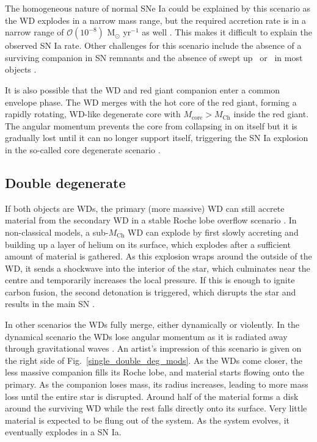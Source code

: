 \documentclass[a4paper,oneside,12pt, class=Latex/Classes/PhDthesisPSnPDF, crop=false]{standalone}
\begin{document}
The homogeneous nature of normal SNe Ia could be explained by this scenario as the WD explodes in a narrow mass range, but the required accretion rate is in a narrow range of $\mathcal{O}(10^{-8})$ M$_\odot$ yr$^{-1}$ as well \citep[e.g.][]{He-accreting_WDs, accreting_WDs}. This makes it difficult to explain the observed SN Ia rate. Other challenges for this scenario include the absence of a surviving companion in SN remnants \citep[e.g][]{SNR0509_no_survivor, Kepler_no_survivor} and the absence of swept up \ or \ in most objects \citep{companion_H_in_Ia_search, Ia_nebular_specs}.

It is also possible that the WD and red giant companion enter a common envelope phase. The WD merges with the hot core of the red giant, forming a rapidly rotating, WD-like degenerate core with $M_\text{core}>M_\text{Ch}$ inside the red giant. The angular momentum prevents the core from collapsing in on itself but it is gradually lost until it can no longer support itself, triggering the SN Ia explosion in the so-called core degenerate scenario \citep{Kashi_core_deg}.


\subsection{Double degenerate}
If both objects are WDs, the primary (more massive) WD can still accrete material from the secondary WD in a stable Roche lobe overflow scenario \citep{CO_accretion_II, CO_accretion_I}. In non-classical models, a sub-$M_\text{Ch}$ WD can explode by first slowly accreting and building up a layer of helium on its surface, which explodes after a sufficient amount of material is gathered. As this explosion wraps around the outside of the WD, it sends a shockwave into the interior of the star, which culminates near the centre and temporarily increases the local pressure. If this is enough to ignite carbon fusion, the second detonation is triggered, which disrupts the star and results in the main SN \citep{Taam_ddet, Livne_ddet, Shen_ddet, Fink_ddet}.

In other scenarios the WDs fully merge, either dynamically or violently. In the dynamical scenario the WDs lose angular momentum as it is radiated away through gravitational waves \citep{Iben_Double_degenerate, Webbink_Double_degenerate}. An artist's impression of this scenario is given on the right side of Fig.~\ref{single_double_deg_mods}. As the WDs come closer, the less massive companion fills its Roche lobe, and material starts flowing onto the primary. As the companion loses mass, its radius increases, leading to more mass loss until the entire star is disrupted. Around half of the material forms a disk around the surviving WD while the rest falls directly onto its surface. Very little material is expected to be flung out of the system. As the system evolves, it eventually explodes in a SN Ia.
\end{document}
